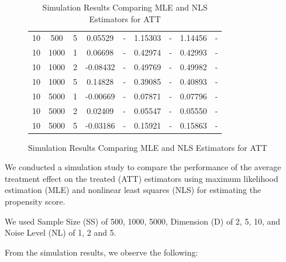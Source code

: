 \documentclass{article}
\begin{document}
\begin{figure}[H]
\begin{table}[H]
\begin{tabular}{|ccc|cccccc|}
      10 & 500 & 5 & 0.05529 & - & 1.15303 & - & 1.14456 & - \\
      10 & 1000 & 1 & 0.06698 & - & 0.42974 & - & 0.42993 & - \\
      10 & 1000 & 2 & -0.08432 & - & 0.49769 & - & 0.49982 & - \\
      10 & 1000 & 5 & 0.14828 & - & 0.39085 & - & 0.40893 & - \\
      10 & 5000 & 1 & -0.00669 & - & 0.07871 & - & 0.07796 & - \\
      10 & 5000 & 2 & 0.02409 & - & 0.05547 & - & 0.05550 & - \\
      10 & 5000 & 5 & -0.03186 & - & 0.15921 & - & 0.15863 & - \\
      \hline
  \end{tabular}
  \caption{Simulation Results Comparing MLE and NLS Estimators for ATT}
\end{table}
\end{figure}

We conducted a simulation study to compare the performance of the average treatment effect on the treated (ATT) estimators using maximum likelihood estimation (MLE) and nonlinear least squares (NLS) for estimating the propensity score.

We used Sample Size (SS) of 500, 1000, 5000, Dimension (D) of 2, 5, 10, and Noise Level (NL) of 1, 2 and 5.

From the simulation results, we observe the following:
\end{document}
